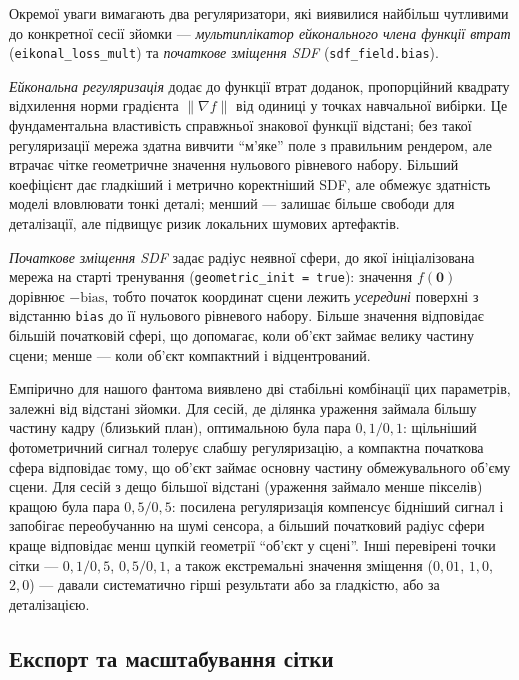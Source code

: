 \documentclass[
  ukrainian,
  10pt,
  a4paper,
  twocolumn]{article}
\begin{document}
Окремої уваги вимагають два регуляризатори, які виявилися найбільш
чутливими до конкретної сесії зйомки --- \emph{мультиплікатор
ейконального члена функції втрат} (\texttt{eikonal\_loss\_mult}) та
\emph{початкове зміщення SDF} (\texttt{sdf\_field.bias}).

\emph{Ейкональна регуляризація} додає до функції втрат доданок,
пропорційний квадрату відхилення норми градієнта
\(\lVert\nabla f\rVert\) від одиниці у точках навчальної вибірки. Це
фундаментальна властивість справжньої знакової функції відстані; без
такої регуляризації мережа здатна вивчити ``м'яке'' поле з правильним
рендером, але втрачає чітке геометричне значення нульового рівневого
набору. Більший коефіцієнт дає гладкіший і метрично коректніший SDF, але
обмежує здатність моделі вловлювати тонкі деталі; менший --- залишає
більше свободи для деталізації, але підвищує ризик локальних шумових
артефактів.

\emph{Початкове зміщення SDF} задає радіус неявної сфери, до якої
ініціалізована мережа на старті тренування
(\texttt{geometric\_init\ =\ true}): значення \(f(\mathbf{0})\) дорівнює
\(-\text{bias}\), тобто початок координат сцени лежить \emph{усередині}
поверхні з відстанню \texttt{bias} до її нульового рівневого набору.
Більше значення відповідає більшій початковій сфері, що допомагає, коли
об'єкт займає велику частину сцени; менше --- коли об'єкт компактний і
відцентрований.

Емпірично для нашого фантома виявлено дві стабільні комбінації цих
параметрів, залежні від відстані зйомки. Для сесій, де ділянка ураження
займала більшу частину кадру (близький план), оптимальною була пара
\(0,1 / 0,1\): щільніший фотометричний сигнал толерує слабшу
регуляризацію, а компактна початкова сфера відповідає тому, що об'єкт
займає основну частину обмежувального об'єму сцени. Для сесій з дещо
більшої відстані (ураження займало менше пікселів) кращою була пара
\(0,5 / 0,5\): посилена регуляризація компенсує бідніший сигнал і
запобігає переобучанню на шумі сенсора, а більший початковий радіус
сфери краще відповідає менш цупкій геометрії ``об'єкт у сцені''. Інші
перевірені точки сітки --- \(0,1 / 0,5\), \(0,5 / 0,1\), а також
екстремальні значення зміщення (\(0,01\), \(1,0\), \(2,0\)) --- давали
систематично гірші результати або за гладкістю, або за деталізацією.

\subsection{Експорт та масштабування
сітки}\label{ux435ux43aux441ux43fux43eux440ux442-ux442ux430-ux43cux430ux441ux448ux442ux430ux431ux443ux432ux430ux43dux43dux44f-ux441ux456ux442ux43aux438}
\end{document}
